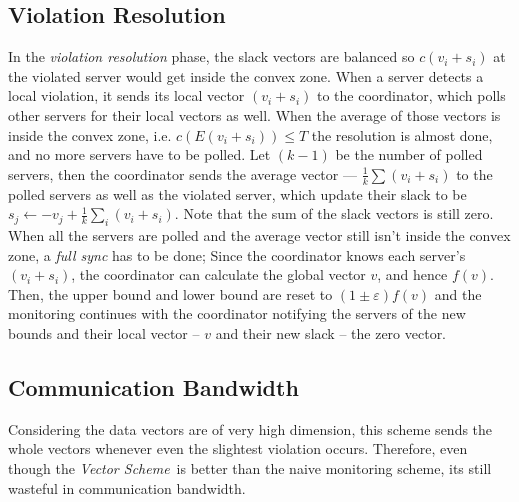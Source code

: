 \documentclass[10pt, conference]{IEEEtran}
\newcommand{\vectorScheme}{\textit{Vector Scheme}}
\begin{document}
\subsection{Violation Resolution}
In the \textit{violation resolution} phase, the slack vectors are balanced so ${c(v_i+s_i)}$ at the violated server would get inside the convex zone. When a server detects a local violation, it sends its local vector ${(v_i + s_i)}$ to the coordinator, which polls other servers for their local vectors as well. When the average of those vectors is inside the convex zone, i.e. ${c(E(v_i + s_i)) \leq T}$ the resolution is almost done, and no more servers have to be polled. Let ${(k-1)}$ be the number of polled servers, then the coordinator sends the average vector --- ${\frac{1}{k}\sum{(v_i + s_i)}}$ to the polled servers as well as the violated server, which update their slack to be ${s_j \leftarrow -v_j + \frac{1}{k}\sum_i{(v_i + s_i)}}$. Note that the sum of the slack vectors is still zero. \\
When all the servers are polled and the average vector still isn't inside the convex zone, a \textit{full sync} has to be done; Since the coordinator knows each server's ${(v_i + s_i)}$, the coordinator can calculate the global vector $v$, and hence $f(v)$. Then, the upper bound and lower bound are reset to ${(1 \pm \varepsilon )f(v)}$ and the monitoring continues with the coordinator notifying the servers of the new bounds and their local vector -- $v$ and their new slack -- the zero vector.
\subsection{Communication Bandwidth}
Considering the data vectors are of very high dimension, this scheme sends the whole vectors whenever even the slightest violation occurs. Therefore, even though the \vectorScheme \  is better than the naive monitoring scheme, its still wasteful in communication bandwidth.

\end{document}
